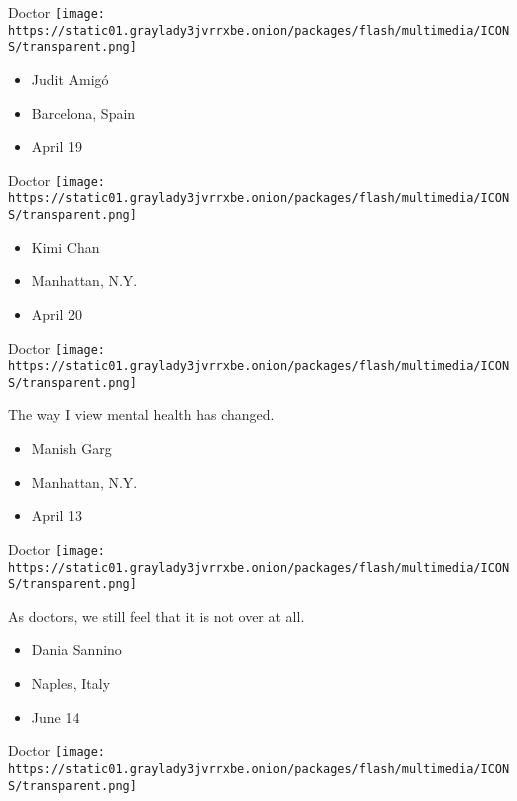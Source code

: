 \protect\hyperlink{item-judit-amigo}{}

Doctor
\texttt{[image: https://static01.graylady3jvrrxbe.onion/packages/flash/multimedia/ICONS/transparent.png]}

\begin{itemize}
\tightlist
\item
  Judit Amigó
\item
  Barcelona, Spain
\item
  April 19
\end{itemize}

\protect\hyperlink{item-kimi-chan}{}

Doctor
\texttt{[image: https://static01.graylady3jvrrxbe.onion/packages/flash/multimedia/ICONS/transparent.png]}

\begin{itemize}
\tightlist
\item
  Kimi Chan
\item
  Manhattan, N.Y.
\item
  April 20
\end{itemize}

\protect\hyperlink{item-manish-garg}{}

Doctor
\texttt{[image: https://static01.graylady3jvrrxbe.onion/packages/flash/multimedia/ICONS/transparent.png]}

The way I view mental health has changed.

\begin{itemize}
\tightlist
\item
  Manish Garg
\item
  Manhattan, N.Y.
\item
  April 13
\end{itemize}

\protect\hyperlink{item-dania-sannino}{}

Doctor
\texttt{[image: https://static01.graylady3jvrrxbe.onion/packages/flash/multimedia/ICONS/transparent.png]}

As doctors, we still feel that it is not over at all.

\begin{itemize}
\tightlist
\item
  Dania Sannino
\item
  Naples, Italy
\item
  June 14
\end{itemize}

\protect\hyperlink{item-mitchell-elliott}{}

Doctor
\texttt{[image: https://static01.graylady3jvrrxbe.onion/packages/flash/multimedia/ICONS/transparent.png]}

